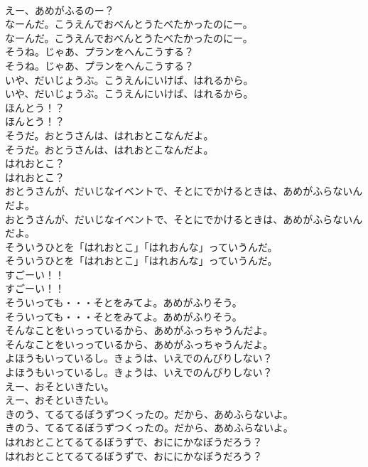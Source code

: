 \documentclass[8pt]{extreport}
\begin{document}
\begin{CJK}{UTF8}{min}
\\	えー、あめがふるのー？ 
\\	なーんだ。こうえんでおべんとうたべたかったのにー。	
\\	なーんだ。こうえんでおべんとうたべたかったのにー。 
\\	そうね。じゃあ、プランをへんこうする？	
\\	そうね。じゃあ、プランをへんこうする？ 
\\	いや、だいじょうぶ。こうえんにいけば、はれるから。	
\\	いや、だいじょうぶ。こうえんにいけば、はれるから。 
\\	ほんとう！？	
\\	ほんとう！？ 
\\	そうだ。おとうさんは、はれおとこなんだよ。	
\\	そうだ。おとうさんは、はれおとこなんだよ。 
\\	はれおとこ？	
\\	はれおとこ？ 
\\	おとうさんが、だいじなイベントで、そとにでかけるときは、あめがふらないんだよ。	
\\	おとうさんが、だいじなイベントで、そとにでかけるときは、あめがふらないんだよ。 
\\	そういうひとを「はれおとこ」「はれおんな」っていうんだ。	
\\	そういうひとを「はれおとこ」「はれおんな」っていうんだ。 
\\	すごーい！！	
\\	すごーい！！ 
\\	そういっても・・・そとをみてよ。あめがふりそう。	
\\	そういっても・・・そとをみてよ。あめがふりそう。 
\\	そんなことをいっっているから、あめがふっちゃうんだよ。	
\\	そんなことをいっっているから、あめがふっちゃうんだよ。 
\\	よほうもいっているし。きょうは、いえでのんびりしない？	
\\	よほうもいっているし。きょうは、いえでのんびりしない？ 
\\	えー、おそといきたい。	
\\	えー、おそといきたい。 
\\	きのう、てるてるぼうずつくったの。だから、あめふらないよ。	
\\	きのう、てるてるぼうずつくったの。だから、あめふらないよ。 
\\	はれおとことてるてるぼうずで、おににかなぼうだろう？	
\\	はれおとことてるてるぼうずで、おににかなぼうだろう？ 

\end{CJK}
\end{document}
